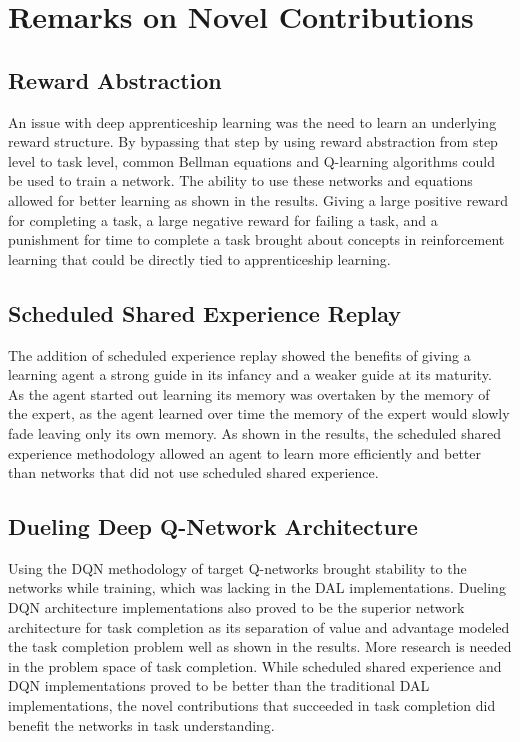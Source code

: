 \documentclass[12pt,american]{report}
\begin{document}
\section{Remarks on Novel Contributions}
\subsection{Reward Abstraction}
An issue with deep apprenticeship learning was the need to learn an underlying reward structure.  By bypassing that step by using reward abstraction from step level to task level, common Bellman equations and Q-learning algorithms could be used to train a network.  The ability to use these networks and equations allowed for better learning as shown in the results.  Giving a large positive reward for completing a task, a large negative reward for failing a task, and a punishment for time to complete a task brought about concepts in reinforcement learning that could be directly tied to apprenticeship learning.

\subsection{Scheduled Shared Experience Replay}
The addition of scheduled experience replay showed the benefits of giving a learning agent a strong guide in its infancy and a weaker guide at its maturity.  As the agent started out learning its memory was overtaken by the memory of the expert, as the agent learned over time the memory of the expert would slowly fade leaving only its own memory.  As shown in the results, the scheduled shared experience methodology allowed an agent to learn more efficiently and better than networks that did not use scheduled shared experience.

\subsection{Dueling Deep Q-Network Architecture}
Using the DQN methodology of target Q-networks brought stability to the networks while training, which was lacking in the DAL implementations.  Dueling DQN architecture implementations also proved to be the superior network architecture for task completion as its separation of value and advantage modeled the task completion problem well as shown in the results. More research is needed in the problem space of task completion.  While scheduled shared experience and DQN implementations proved to be better than the traditional DAL implementations, the novel contributions that succeeded in task completion did benefit the networks in task understanding.
\end{document}
